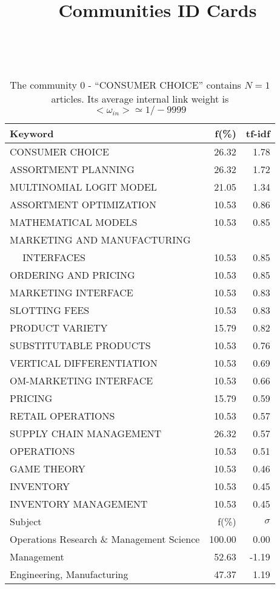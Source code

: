 \documentclass[a4paper,11pt]{report}
\title{{\bf Communities ID Cards}}
\date{\begin{flushleft}This document gather the ``ID Cards'' of the CC communities found within your database.\\
 The CC network was built by keeping a link between articles sharing at least 5 references. The communities characterized here correspond to the ones found in the level 0 (in the sense of the Louvain algo) which gathers more than 0 articles.\\
 These ID cards displays the most frequent keywords, subject categories, journals of publication, institution, countries, authors, references and reference journals of the articles of each community. The significance of an item $\sigma = \sqrt{N} (f - p) / \sqrt{p(1-p)}$ [where $N$ is the number of articles within the community and $f$ and $p$ are the proportion of articles respectively within the community and within the database displaying that item ] is also given (for example $\sigma > 5$ is really highly significant). The tf-idf value which can be calculated by $tf-idf = f*log(frac{1}{p})$ is also given.\\
\vspace{1cm}
\copyright Sebastian Grauwin, Liu Weizhi - (2014) \end{flushleft}}
\begin{document}
\begin{landscape}
\maketitle
\clearpage

\begin{table}[!ht]
\caption{The community 0 - ``CONSUMER CHOICE'' contains $N = 1$ articles. Its average internal link weight is $<\omega_{in}> \simeq 1/-9999$ }
\textcolor{white}{aa}\\
{\scriptsize\begin{tabular}{|l r  r|}
\hline
Keyword & f(\%) & tf-idf \\
\hline
CONSUMER CHOICE & 26.32 & 1.78\\
ASSORTMENT PLANNING & 26.32 & 1.72\\
MULTINOMIAL LOGIT MODEL & 21.05 & 1.34\\
ASSORTMENT OPTIMIZATION & 10.53 & 0.86\\
MATHEMATICAL MODELS & 10.53 & 0.85\\
MARKETING AND MANUFACTURING &  &\\
$\quad$ INTERFACES & 10.53 & 0.85\\
ORDERING AND PRICING & 10.53 & 0.85\\
MARKETING INTERFACE & 10.53 & 0.83\\
SLOTTING FEES & 10.53 & 0.83\\
PRODUCT VARIETY & 15.79 & 0.82\\
SUBSTITUTABLE PRODUCTS & 10.53 & 0.76\\
VERTICAL DIFFERENTIATION & 10.53 & 0.69\\
OM-MARKETING INTERFACE & 10.53 & 0.66\\
PRICING & 15.79 & 0.59\\
RETAIL OPERATIONS & 10.53 & 0.57\\
SUPPLY CHAIN MANAGEMENT & 26.32 & 0.57\\
OPERATIONS & 10.53 & 0.51\\
GAME THEORY & 10.53 & 0.46\\
INVENTORY & 10.53 & 0.45\\
INVENTORY MANAGEMENT & 10.53 & 0.45\\
\hline
\hline
Subject & f(\%) & $\sigma$\\
\hline
Operations Research \& Management Science & 100.00 & 0.00\\
Management & 52.63 & -1.19\\
Engineering, Manufacturing & 47.37 & 1.19\\

\end{tabular}}
\end{table}
\end{landscape}
\end{document}
